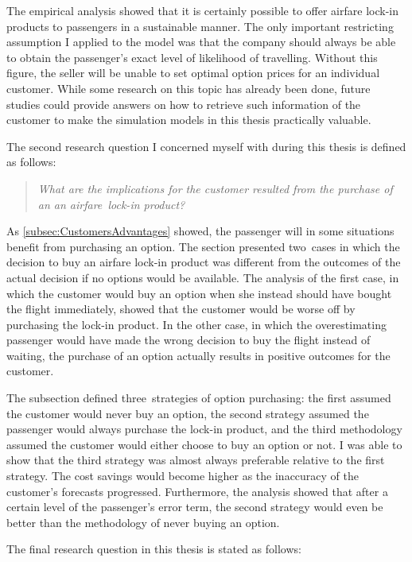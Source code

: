 The empirical analysis showed that it is certainly possible to offer airfare lock-in products to passengers in a sustainable manner. The only important restricting assumption I applied to the model was that the company should always be able to obtain the passenger's exact level of likelihood of travelling. Without this figure, the seller will be unable to set optimal option prices for an individual customer. While some research on this topic has already been done, future studies could provide answers on how to retrieve such information of the customer to make the simulation models in this thesis practically valuable.

The second research question I concerned myself with during this thesis is defined as follows:

\begin{quote}\emph{What are the implications for the customer resulted from the purchase of an an airfare~lock-in product?}\end{quote}

As \autoref{subsec:CustomersAdvantages} showed, the passenger will in some situations benefit from purchasing an option. The section presented two~cases in which the decision to buy an airfare lock-in product was different from the outcomes of the actual decision if no options would be available. The analysis of the first case, in which the customer would buy an option when she instead should have bought the flight immediately, showed that the customer would be worse off by purchasing the lock-in product. In the other case, in which the overestimating passenger would have made the wrong decision to buy the flight instead of waiting, the purchase of an option actually results in positive outcomes for the customer.

The subsection defined three~strategies of option purchasing: the first assumed the customer would never buy an option, the second strategy assumed the passenger would always purchase the lock-in product, and the third methodology assumed the customer would either choose to buy an option or not. I was able to show that the third strategy was almost always preferable relative to the first strategy. The cost savings would become higher as the inaccuracy of the customer's forecasts progressed. Furthermore, the analysis showed that after a certain level of the passenger's error term, the second strategy would even be better than the methodology of never buying an option.

The final research question in this thesis is stated as follows:

